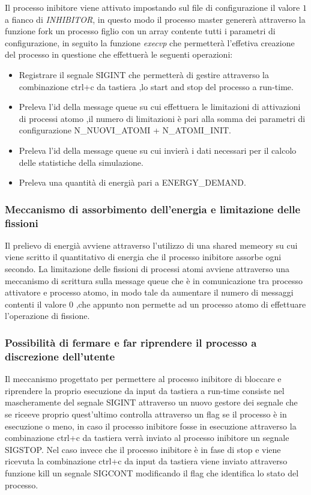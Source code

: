 Il processo inibitore viene attivato impostando sul file di configurazione il valore $1$
 a fianco di \textit{INHIBITOR}, in questo modo il processo master
genererà attraverso la funzione fork un processo figlio con un array contente tutti
 i parametri di configurazione, in seguito la funzione
  \textit{execvp} che permetterà l'effetiva creazione del processo in questione che effettuerà le 
  seguenti operazioni: 
\begin{itemize}
    \item Registrare il segnale SIGINT che permetterà di gestire attraverso la combinazione ctrl+c da tastiera ,lo start and stop del processo a run-time.
    \item Preleva l'id della message queue su cui effettuera le limitazioni di attivazioni di processi atomo ,il numero di limitazioni è pari alla somma dei parametri di configurazione N\_NUOVI\_ATOMI + N\_ATOMI\_INIT. 
    \item Preleva l'id della message queue su cui invierà i dati necessari per il calcolo delle statistiche della simulazione. 
    \item Preleva una quantità di energià pari a ENERGY\_DEMAND.
\end{itemize}
\subsubsection{Meccanismo di assorbimento dell'energia e limitazione delle fissioni}
Il prelievo di energià avviene attraverso l'utilizzo di una shared memeory su cui viene scritto il quantitativo di energia che il processo inibitore assorbe ogni secondo. 
\newline
La limitazione delle fissioni di processi atomi avviene attraverso una meccanismo di scrittura sulla message queue che è in comunicazione tra processo attivatore e processo atomo, in modo tale da aumentare il numero di messaggi contenti il valore 0 ,che appunto non permette ad un processo atomo di effettuare l'operazione di fissione. 
\subsubsection{Possibilità di fermare e far riprendere il processo a discrezione dell'utente}
Il meccanismo progettato per permettere al processo inibitore di bloccare e riprendere la proprio esecuzione da input da tastiera a run-time consiste nel mascheramente del segnale SIGINT attraverso un nuovo gestore dei segnale che se riceeve proprio quest'ultimo controlla attraverso un flag se il processo è in esecuzione o meno, in caso il processo inibitore fosse in esecuzione attraverso la combinazione ctrl+c da tastiera verrà inviato al processo inibitore un segnale SIGSTOP.
Nel caso invece che il processo inibitore è in fase di stop e viene ricevuta la combinazione ctrl+c da input da tastiera viene inviato attraverso funzione kill un segnale SIGCONT modificando il flag che identifica lo stato del processo. 
